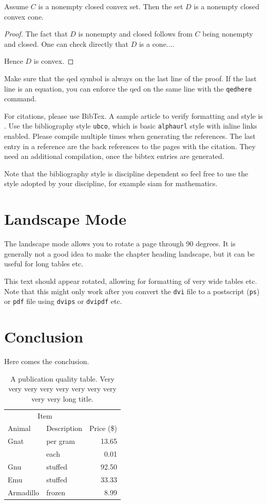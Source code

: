 \documentclass[msc,oneside]{ubcthesis}%
\begin{document}
\begin{lemma}
Assume $C$ is a nonempty closed convex set. Then the set $D$ is a nonempty closed convex cone.
\end{lemma}

\begin{proof}
The fact that $D$ is nonempty and closed follows from $C$ being non\-empty and closed. One can check directly that $D$ is a cone....

Hence $D$ is convex.
\end{proof}
Make sure that the qed symbol is always on the last line of the proof. If the last line is an equation, you can enforce the qed on the same line with the \texttt{qedhere} command.

For citations, please use BibTex. A sample article to verify formatting and style is \cite{Bauschke:2007-PA02}. Use the bibliography style \texttt{ubco}, which is basic \texttt{alphaurl} style with inline links enabled. Please compile multiple times when generating the references. The last entry in a reference are the back references to the pages with the citation. They need an additional compilation, once the bibtex entries are generated.

Note that the bibliography style is discipline dependent so feel free to use the style adopted by your discipline, for example siam for mathematics.

\chapter{Landscape Mode}
The landscape mode allows you to rotate a page through 90 degrees.  It
is generally not a good idea to make the chapter heading landscape,
but it can be useful for long tables etc.

\begin{landscape}
  This text should appear rotated, allowing for formatting of very
  wide tables etc.  Note that this might only work after you convert
  the \texttt{dvi} file to a postscript (\texttt{ps}) or \texttt{pdf}
  file using \texttt{dvips} or \texttt{dvipdf} etc.
\end{landscape}

\chapter{Conclusion}
Here comes the conclusion.
\begin{table}[tbph]
\centering
\caption{A publication quality table. Very very very very very very very very very very long title.
\label{table:food1}}
\begin{tabular}{@{}llr@{}} \toprule 
\multicolumn{2}{c}{Item} \\ \cmidrule(r){1-2} 
Animal & Description & Price (\$)\\ \midrule 
Gnat & per gram & 13.65 \\ 
& each & 0.01 \\ 
Gnu & stuffed & 92.50 \\ 
Emu & stuffed & 33.33 \\ 
Armadillo & frozen & 8.99 \\ \bottomrule 
\end{tabular}
\end{table}
\end{document}
